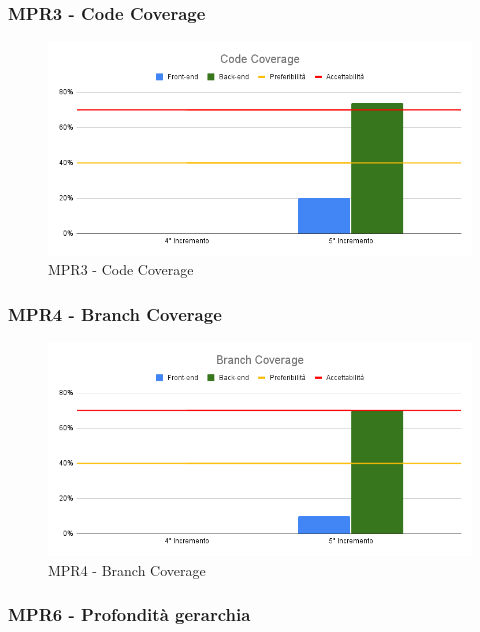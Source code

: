 \subsubsection{MPR3 - Code Coverage}

\begin{figure}[H]
	\centering
	\includegraphics[scale = 0.6]{sezioni/Images/PB/CodeCoverage.png}
	\caption{MPR3 - Code Coverage}
\end{figure}

\subsubsection{MPR4 - Branch Coverage}

\begin{figure}[H]
	\centering
	\includegraphics[scale = 0.6]{sezioni/Images/PB/BranchCoverage.png}
	\caption{MPR4 - Branch Coverage}
\end{figure}

\subsubsection{MPR6 - Profondità gerarchia}

